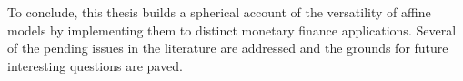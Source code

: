 To conclude, this thesis builds a spherical account of the versatility of affine models by implementing them to distinct monetary finance applications. Several of the pending issues in the literature are addressed and the grounds for future interesting questions are paved. 
 

